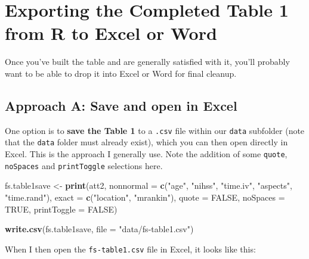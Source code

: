 \documentclass[]{book}
\newenvironment{Shaded}{\begin{snugshade}}{\end{snugshade}}
\newcommand{\KeywordTok}[1]{\textcolor[rgb]{0.13,0.29,0.53}{\textbf{#1}}}
\newcommand{\DataTypeTok}[1]{\textcolor[rgb]{0.13,0.29,0.53}{#1}}
\newcommand{\StringTok}[1]{\textcolor[rgb]{0.31,0.60,0.02}{#1}}
\newcommand{\OtherTok}[1]{\textcolor[rgb]{0.56,0.35,0.01}{#1}}
\newcommand{\NormalTok}[1]{#1}
\theoremstyle{definition}
\theoremstyle{definition}
\theoremstyle{definition}
\theoremstyle{remark}
\begin{document}
\section{Exporting the Completed Table 1 from R to Excel or
Word}\label{exporting-the-completed-table-1-from-r-to-excel-or-word}

Once you've built the table and are generally satisfied with it, you'll
probably want to be able to drop it into Excel or Word for final
cleanup.

\subsection{Approach A: Save and open in
Excel}\label{approach-a-save-and-open-in-excel}

One option is to \textbf{save the Table 1} to a \texttt{.csv} file
within our \texttt{data} subfolder (note that the \texttt{data} folder
must already exist), which you can then open directly in Excel. This is
the approach I generally use. Note the addition of some \texttt{quote},
\texttt{noSpaces} and \texttt{printToggle} selections here.

\begin{Shaded}
\begin{Highlighting}[]
\NormalTok{fs.table1save <-}\StringTok{ }\KeywordTok{print}\NormalTok{(att2, }
      \DataTypeTok{nonnormal =} \KeywordTok{c}\NormalTok{(}\StringTok{"age"}\NormalTok{, }\StringTok{"nihss"}\NormalTok{, }\StringTok{"time.iv"}\NormalTok{, }\StringTok{"aspects"}\NormalTok{, }\StringTok{"time.rand"}\NormalTok{),}
      \DataTypeTok{exact =} \KeywordTok{c}\NormalTok{(}\StringTok{"location"}\NormalTok{, }\StringTok{"mrankin"}\NormalTok{),}
      \DataTypeTok{quote =} \OtherTok{FALSE}\NormalTok{, }\DataTypeTok{noSpaces =} \OtherTok{TRUE}\NormalTok{, }\DataTypeTok{printToggle =} \OtherTok{FALSE}\NormalTok{)}

\KeywordTok{write.csv}\NormalTok{(fs.table1save, }\DataTypeTok{file =} \StringTok{"data/fs-table1.csv"}\NormalTok{)}
\end{Highlighting}
\end{Shaded}

When I then open the \texttt{fs-table1.csv} file in Excel, it looks like
this:
\end{document}
